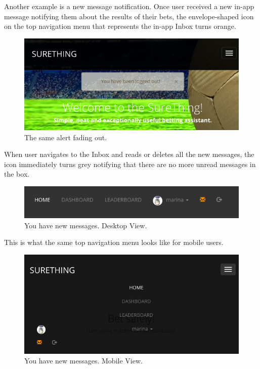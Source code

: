 Another example is a new message notification. Once user received a new in-app message notifying them about the results of their bets, the envelope-shaped icon on the top navigation menu that represents the in-app Inbox turns orange. 

\begin{figure}[H]
	\begin{center}
		\includegraphics[width=.60\linewidth,natwidth=610,natheight=642]{impl/images/alertFadeOut}
		\caption{The same alert fading out.} \label{fig:alertFadeOut}
	\end{center}
\end{figure}

When user navigates to the Inbox and reads or deletes all the new messages, the icon immediately turns grey notifying that there are no more unread messages in the box.
 
\begin{figure}[H]
	\begin{center}
		\includegraphics[width=.60\linewidth,natwidth=610,natheight=642]{impl/images/newMessagesDesktopView}
		\caption{You have new messages. Desktop View.} \label{fig:newMessagesDesktopView}
	\end{center}
\end{figure}

This is what the same top navigation menu looks like for mobile users. 

\begin{figure}[H]
	\begin{center}
		\includegraphics[width=.60\linewidth,natwidth=610,natheight=642]{impl/images/newMessagesMobileView}
		\caption{You have new messages. Mobile View.} \label{fig:newMessagesMobileView}
	\end{center}
\end{figure}

